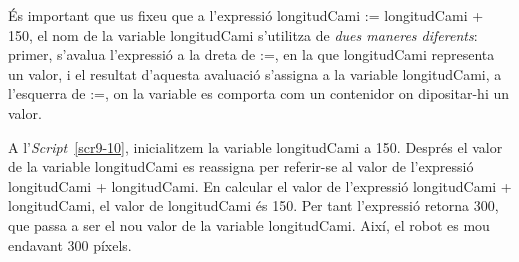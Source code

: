 És important que us fixeu que a l'expressió \textsf{longitudCami := longitudCami + 150}, el nom de la variable \textsf{longitudCami} s'utilitza de \emph{dues maneres diferents}: primer, s'avalua l'expressió a la dreta de \textsf{:=}, en la que \textsf{longitudCami} representa un valor, i el resultat d'aquesta avaluació s'assigna a la variable \textsf{longitudCami}, a l'esquerra de \textsf{:=}, on la variable es comporta com un contenidor on dipositar-hi un valor.

A l'\emph{Script}~\ref{scr9-10}, inicialitzem la variable \textsf{longitudCami} a \textsf{150}. Després el valor de la variable \textsf{longitudCami} es reassigna per referir-se al valor de l'expressió \textsf{longitudCami + longitudCami}. En calcular el valor de l'expressió \textsf{longitudCami + longitudCami}, el valor de \textsf{longitudCami} és \textsf{150}. Per tant l'expressió retorna \textsf{300}, que passa a ser el nou valor de la variable \textsf{longitudCami}. Així, el robot es mou endavant \textsf{300} píxels.  

